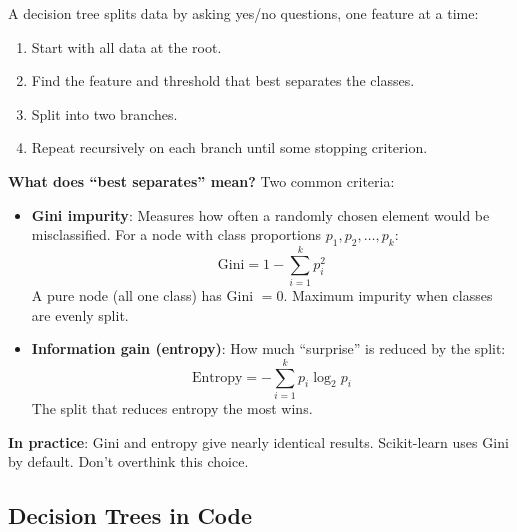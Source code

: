 A decision tree splits data by asking yes/no questions, one feature at a time:

\begin{enumerate}
    \item Start with all data at the root.
    \item Find the feature and threshold that best separates the classes.
    \item Split into two branches.
    \item Repeat recursively on each branch until some stopping criterion.
\end{enumerate}

\textbf{What does ``best separates'' mean?} Two common criteria:

\begin{itemize}
    \item \textbf{Gini impurity}: Measures how often a randomly chosen element would be misclassified. For a node with class proportions $p_1, p_2, \ldots, p_k$:
    $$\text{Gini} = 1 - \sum_{i=1}^{k} p_i^2$$
    A pure node (all one class) has Gini $= 0$. Maximum impurity when classes are evenly split.

    \item \textbf{Information gain (entropy)}: How much ``surprise'' is reduced by the split:
    $$\text{Entropy} = -\sum_{i=1}^{k} p_i \log_2 p_i$$
    The split that reduces entropy the most wins.
\end{itemize}

\begin{asidebox}
\textbf{In practice}: Gini and entropy give nearly identical results. Scikit-learn uses Gini by default. Don't overthink this choice.
\end{asidebox}

\subsection{Decision Trees in Code}

